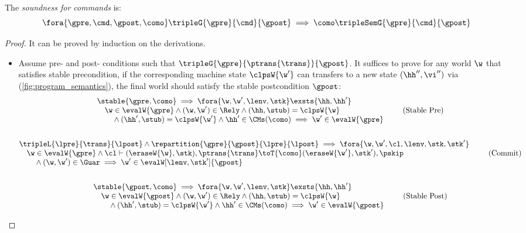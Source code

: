 \begin{theorem}
\label{thm:command-soundness}
\label{thm:per-thread-soundness}
The \emph{soundness for commands} is:
\[
    \fora{\gpre, \cmd, \gpost, \como}
    \tripleG{\gpre}{\cmd}{\gpost} 
    \implies 
    \como \tripleSemG{\gpre}{\cmd}{\gpost} 
\]
\end{theorem}
\begin{proof}
It can be proved by induction on the derivations.

\begin{itemize}

\item {}
Assume pre- and post- conditions such that \( \tripleG{\gpre}{\ptrans{\trans}}{\gpost}  \).
It suffices to prove for any world \( \w \) that satisfies stable precondition, if the corresponding machine state \(\clpsW{\w'}\) can transfers to a new state \((\hh'',\vi'')\) via  (\cref{fig:program_semantics}), the final world should satisfy the stable postcondition \(\gpost\):
\begin{gather}
    \begin{array}{@{}l}
    \stable{\gpre, \como}  
    \implies 
    \fora{\w, \w',\lenv, \stk}  
    \exsts{ \hh, \hh' }  \\
    \quad \w \in \evalW{\gpre} 
    \land (\w, \w') \in \Rely 
    \land (\hh, \stub) = \clpsW{\w} \\
    \qquad {} \land (\hh', \stub) = \clpsW{\w'} 
    \land \hh' \in \CMs(\como)
    \implies \w' \in \evalW{\gpre} 
    \end{array} \tag{Stable Pre} \label{equ:stable-pre-condition} \\
    \nonumber \\
%
    \begin{array}{@{}l}
    \tripleL{\lpre}{\trans}{\lpost}
    \land \repartition{\gpre}{\gpost}{\lpre}{\lpost}
    \implies 
    \fora{\w, \w', \cl, \lenv, \stk, \stk'}  \\
    \quad \w \in \evalW{\gpre} 
    \land \cl \vdash (\eraseW{\w}, \stk), \ptrans{\trans}  
    \toT{\como} (\eraseW{\w'}, \stk'), \pskip \\
    \qquad {} \land (\w, \w') \in \Guar 
    \implies \w' \in \evalW[\lenv, \stk']{\gpost} 
    \end{array} \tag{Commit} \label{equ:commit-transaction} \\
    \nonumber \\
%
    \begin{array}{@{}l}
    \stable{\gpost, \como}  
    \implies 
    \fora{\w, \w',\lenv, \stk}  
    \exsts{ \hh, \hh' } \\
    \quad \w \in \evalW{\gpost} 
    \land (\w, \w') \in \Rely 
    \land (\hh, \stub) = \clpsW{\w} \\
    \qquad {} \land (\hh', \stub) = \clpsW{\w'}
    \land \hh' \in \CMs(\como)
    \implies \w' \in \evalW{\gpost} 
    \end{array} \tag{Stable Post} \label{equ:stable-post-condition} 
\end{gather}


\end{itemize}
\end{proof}
